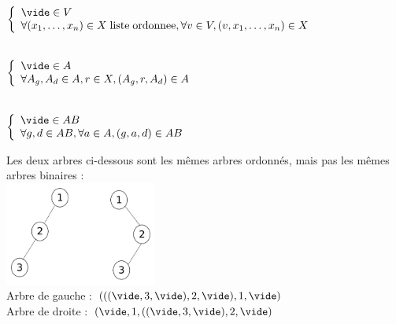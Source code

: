  \\
$\left\{ \begin{array}{l}
	\vide \in V \\
	\forall (x_1,\ldots , x_n)  \in X \; \mathrm{liste}\;\mathrm{ordonnee}, \forall v \in V, (v,x_1,\ldots,x_n) \in X
\end{array} \right.$  \\

\par

 \\
$\left\{ \begin{array}{l}
	\vide \in A \\
	\forall A_g,A_d \in A, r\in X, (A_g,r,A_d)\in A
\end{array} \right.$ \\

\par

 \\
$\left\{ \begin{array}{l}
	\vide \in AB \\
	\forall g,d \in AB, \forall a \in A, (g,a,d)\in AB 
\end{array}
\right.$\\

\par

 Les deux arbres ci-dessous sont les mêmes arbres ordonnés, mais pas les mêmes arbres binaires : \\
\includegraphics[width=5cm]{D4_1.pdf} \\
Arbre de gauche : $(((\vide,3,\vide),2,\vide),1,\vide)$ \\
Arbre de droite : $(\vide,1,((\vide,3,\vide),2,\vide)$
